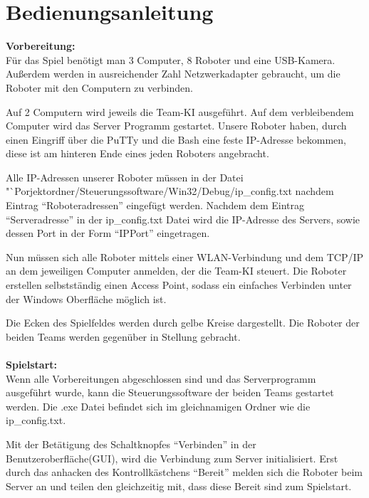 \section{Bedienungsanleitung}
\textbf{Vorbereitung:}\\
Für das Spiel benötigt man 3 Computer, 8 Roboter und eine USB-Kamera. Außerdem werden in ausreichender Zahl Netzwerkadapter gebraucht, um die Roboter mit den Computern zu verbinden.

Auf 2 Computern wird jeweils die Team-KI ausgeführt. Auf dem verbleibendem Computer wird das Server Programm gestartet.
Unsere Roboter haben, durch einen Eingriff über die PuTTy und die Bash eine feste IP-Adresse bekommen, diese ist am hinteren Ende eines jeden Roboters angebracht.

Alle IP-Adressen unserer Roboter müssen in der Datei "`Porjektordner/Steuerungssoftware/Win32/Debug/ip\_config.txt nachdem Eintrag "`Roboteradressen"' eingefügt werden.
Nachdem dem Eintrag "`Serveradresse"' in der ip\_config.txt Datei wird die IP-Adresse des Servers, sowie dessen Port in der Form "`IP\:Port"' eingetragen.

Nun müssen sich alle Roboter mittels einer WLAN-Verbindung und dem TCP/IP an dem jeweiligen Computer anmelden, der die Team-KI steuert. Die Roboter erstellen selbstständig einen Access Point, sodass ein einfaches Verbinden unter der Windows Oberfläche möglich ist.

Die Ecken des Spielfeldes werden durch gelbe Kreise dargestellt. Die Roboter der beiden Teams werden gegenüber in Stellung gebracht.
\\\\
\textbf{Spielstart:}\\
Wenn alle Vorbereitungen abgeschlossen sind und das Serverprogramm ausgeführt wurde, kann die Steuerungssoftware der beiden Teams gestartet werden. Die .exe Datei befindet sich im gleichnamigen Ordner wie die ip\_config.txt.

Mit der Betätigung des Schaltknopfes "`Verbinden"' in der Benutzeroberfläche(GUI), wird die Verbindung zum Server initialisiert. Erst durch das anhacken des Kontrollkästchens "`Bereit"' melden sich die Roboter beim Server an und teilen den gleichzeitig mit, dass diese Bereit sind zum Spielstart.

